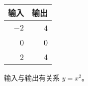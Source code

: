 \begin{tabular}{|rr|}
\hline
  输入 & 输出 \\ \hline
  $-2$ & 4 \\
  0 & 0 \\
  2 & 4 \\
\hline
\end{tabular}
\qquad
输入与输出有关系 $y = x^2$。
